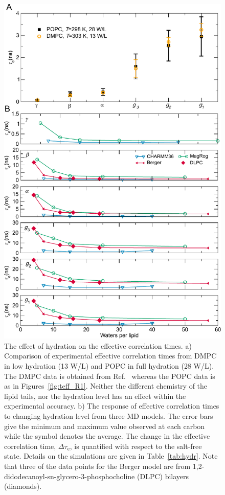 \documentclass[journal=jpcbfk,manuscript=article,layout=twocolumn]{achemso}
\begin{document}
\begin{figure}[ht!]
\centering
\includegraphics[scale=0.51]{hydration.pdf} 

\caption{The effect of hydration on the effective correlation times. a) Comparison of experimental effective correlation times from DMPC in low hydration (13 W/L) and POPC in full hydration (28 W/L). The DMPC data is obtained from Ref.~ whereas the POPC data is as in Figures~\ref{fig:teff_R1}. Neither the different chemistry of the lipid tails, nor the hydration level has an effect within the experimental accuracy. b) The response of effective correlation times to changing hydration level from three MD models. The error bars give the minimum and maximum value observed at each carbon while the symbol denotes the average. The change in the effective correlation time, $\Delta \tau_\mathrm{e}$, is quantified with respect to the salt-free state. Details on the simulations are given in 
Table~\ref{tab:hydr}. Note that three of the data points for the Berger model are from 1,2-didodecanoyl-sn-glycero-3-phosphocholine (DLPC) bilayers (diamonds). }
\label{fig:hydration}

\end{figure}
\end{document}
